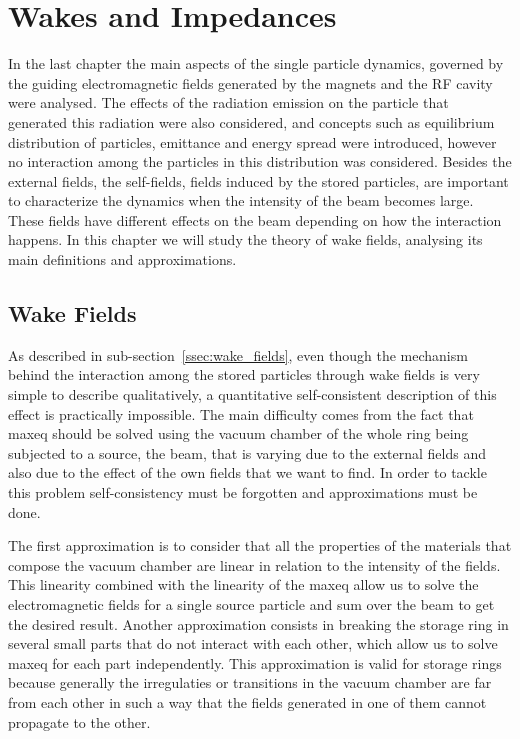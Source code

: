 \chapter{Wakes and Impedances}\label{cap:wakes_impedances}

    In the last chapter the main aspects of the single particle dynamics, governed by the guiding electromagnetic fields generated by the magnets and the RF cavity were analysed. The effects of the radiation emission on the particle that generated this radiation were also considered, and concepts such as equilibrium distribution of particles, emittance and energy spread were introduced, however no interaction among the particles in this distribution was considered. Besides the external fields, the self-fields, fields induced by the stored particles, are important to characterize the dynamics when the intensity of the beam becomes large. These fields have different effects on the beam depending on how the interaction happens. In this chapter we will study the theory of wake fields, analysing its main definitions and approximations.

\section{Wake Fields}\label{sec:wake_fields}

    As described in sub-section~\ref{ssec:wake_fields}, even though the mechanism behind the interaction among the stored particles through wake fields is very simple to describe qualitatively, a quantitative self-consistent description of this effect is practically impossible. The main difficulty comes from the fact that \gls{maxeq} should be solved using the vacuum chamber of the whole ring being subjected to a source, the beam, that is varying due to the external fields and also due to the effect of the own fields that we want to find. In order to tackle this problem self-consistency must be forgotten and approximations must be done.

    The first approximation is to consider that all the properties of the materials that compose the vacuum chamber are linear in relation to the intensity of the fields. This linearity combined with the linearity of the \gls{maxeq} allow us to solve the electromagnetic fields for a single source particle and sum over the beam to get the desired result. Another approximation consists in breaking the storage ring in several small parts that do not interact with each other, which allow us to solve \gls{maxeq} for each part independently. This approximation is valid for storage rings because generally the irregulaties or transitions in the vacuum chamber are far from each other in such a way that the fields generated in one of them cannot propagate to the other.

